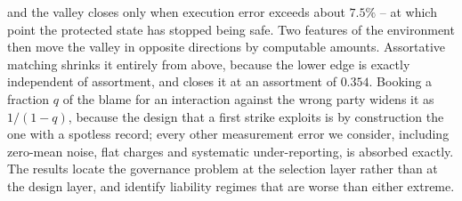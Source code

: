 and the valley closes only when execution error exceeds about $7.5\%$ -- at
which point the protected state has stopped being safe. Two features of the
environment then move the valley in opposite directions by computable amounts.
Assortative matching shrinks it entirely from above, because the lower edge is
exactly independent of assortment, and closes it at an assortment of $0.354$.
Booking a fraction $q$ of the blame for an interaction against the wrong party
widens it as $1/(1-q)$, because the design that a first strike exploits is by
construction the one with a spotless record; every other measurement error we
consider, including zero-mean noise, flat charges and systematic
under-reporting, is absorbed exactly. The results locate the
governance problem at the selection layer rather than at the design layer, and
identify liability regimes that are worse than either extreme.

